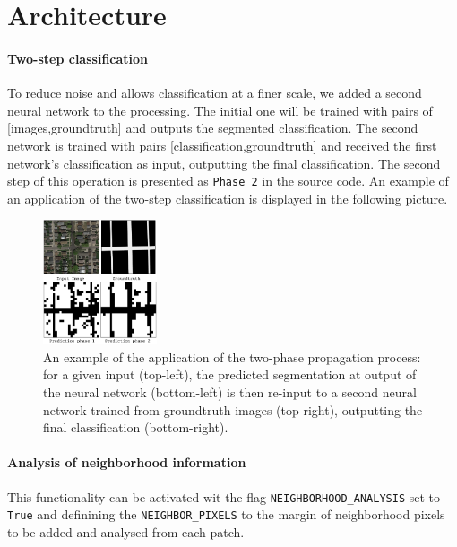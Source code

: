 \documentclass[fleqn,9 pt]{SelfArx} %
\begin{document}
\begin{sloppypar}
\section{Architecture}

\paragraph{Two-step classification} 

To reduce noise and allows classification at a finer scale, we added a second neural network to the processing. The initial one will be trained with pairs of [images,groundtruth] and outputs the segmented classification. The second network is trained with pairs [classification,groundtruth] and received the first network's classification as input, outputting the final classification. The second step of this operation is presented as \texttt{Phase 2} in the source code. An example of an application of the two-step classification is displayed in the following picture.

\begin{figure}[H]
\centering
\includegraphics[width=0.3\textwidth]{figures/two_phases_conv2d.pdf}
\caption{\small An example of the application of the two-phase propagation process: for a given input (top-left), the predicted segmentation at output of the neural network (bottom-left) is then re-input to a second neural network trained from groundtruth images (top-right), outputting the final classification (bottom-right).}
\end{figure}

\paragraph{Analysis of neighborhood information} This functionality can be activated wit the flag \texttt{NEIGHBORHOOD\_ANALYSIS} set to \texttt{True} and definining the \texttt{NEIGHBOR\_PIXELS} to the margin of neighborhood pixels to be added and analysed from each patch.


\end{sloppypar}
\end{document}
